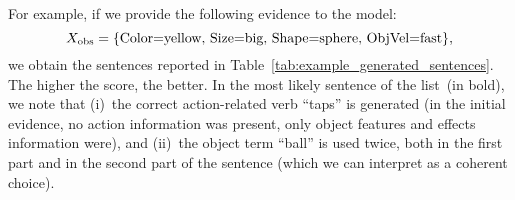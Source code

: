For example, if we provide the following evidence to the model:
\begin{equation} \label{eq:evidence_example}
    \xobs = \{\text{Color=yellow, Size=big, Shape=sphere, ObjVel=fast}\},
\end{equation}
we obtain
the sentences reported in Table~\ref{tab:example_generated_sentences}.
The higher the score, the better.
In the most likely sentence of the list~(in bold), we note that (i)~the correct action-related verb ``taps'' is generated (in the initial evidence, no action information was present, only object features and effects information were), and (ii)~the object term ``ball'' is used twice, both in the first part and in the second part of the sentence (which we can interpret as a coherent choice).


\begin{table}
    \centering
    \caption{$10$-best list of sentences generated from the evidence~\eqref{eq:evidence_example}.}
    \label{tab:example_generated_sentences}
\end{table}

